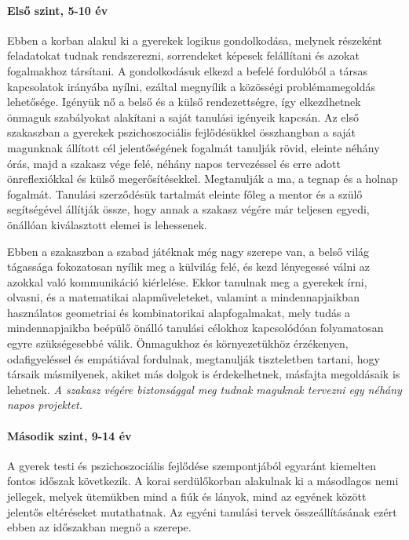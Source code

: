 \paragraph{Első szint, 5-10 év }

Ebben a korban alakul ki a gyerekek logikus gondolkodása, melynek részeként feladatokat tudnak rendszerezni, sorrendeket képesek felállítani és azokat fogalmakhoz társítani. A gondolkodásuk elkezd a befelé fordulóból a társas kapcsolatok irányába nyílni, ezáltal megnyílik a közösségi problémamegoldás lehetősége. Igényük nő a belső és a külső rendezettségre, így elkezdhetnek önmaguk szabályokat alakítani a saját tanulási igényeik kapcsán. Az első szakaszban a gyerekek pszichoszociális fejlődésükkel összhangban a saját magunknak állított cél jelentőségének fogalmát tanulják rövid, eleinte néhány órás, majd a szakasz vége felé, néhány napos tervezéssel és erre adott önreflexiókkal és külső megerősítésekkel.  Megtanulják a ma, a tegnap és a holnap fogalmát. Tanulási szerződésük tartalmát eleinte főleg a mentor és a szülő segítségével állítják össze, hogy annak a szakasz végére már teljesen egyedi, önállóan kiválasztott elemei is lehessenek.

Ebben a szakaszban a szabad játéknak még nagy szerepe van, a belső világ tágassága fokozatosan nyílik meg a külvilág felé, és kezd lényegessé válni az azokkal való kommunikáció kiérlelése. Ekkor tanulnak meg a gyerekek írni, olvasni, és a matematikai alapműveleteket, valamint a mindennapjaikban használatos  geometriai és kombinatorikai alapfogalmakat, mely tudás a mindennapjaikba beépülő önálló tanulási célokhoz kapcsolódóan folyamatosan egyre szükségesebbé válik. Önmagukhoz és környezetükhöz érzékenyen, odafigyeléssel és empátiával fordulnak, megtanulják tiszteletben tartani, hogy társaik másmilyenek, akiket más dolgok is érdekelhetnek, másfajta megoldásaik is lehetnek. \emph{A szakasz végére biztonsággal meg tudnak maguknak tervezni egy néhány napos projektet.}

\paragraph{Második szint, 9-14 év}

A gyerek testi és pszichoszociális fejlődése szempontjából egyaránt kiemelten fontos időszak következik. A korai serdülőkorban alakulnak ki a másodlagos nemi jellegek, melyek ütemükben mind a fiúk és lányok, mind az egyének között jelentős eltéréseket mutathatnak. Az egyéni tanulási tervek összeállításának ezért ebben az időszakban megnő a szerepe.

